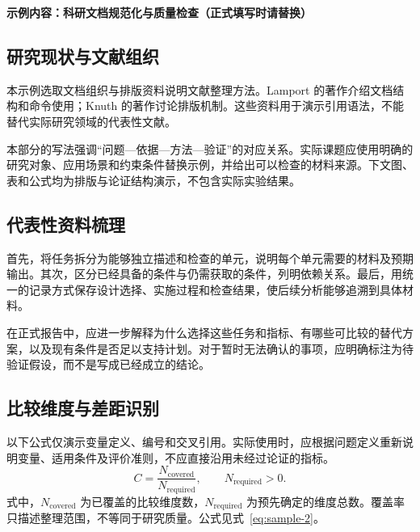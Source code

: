 \noindent\textbf{示例内容：科研文档规范化与质量检查（正式填写时请替换）}\par

\subsection{研究现状与文献组织}
本示例选取文档组织与排版资料说明文献整理方法。Lamport 的著作介绍文档结构和命令使用\cite{lamport1994latex}；Knuth 的著作讨论排版机制\cite{knuth1984texbook}。这些资料用于演示引用语法，不能替代实际研究领域的代表性文献。

本部分的写法强调“问题—依据—方法—验证”的对应关系。实际课题应使用明确的研究对象、应用场景和约束条件替换示例，并给出可以检查的材料来源。下文图、表和公式均为排版与论证结构演示，不包含实际实验结果。

\subsection{代表性资料梳理}
首先，将任务拆分为能够独立描述和检查的单元，说明每个单元需要的材料及预期输出。其次，区分已经具备的条件与仍需获取的条件，列明依赖关系。最后，用统一的记录方式保存设计选择、实施过程和检查结果，使后续分析能够追溯到具体材料。

在正式报告中，应进一步解释为什么选择这些任务和指标、有哪些可比较的替代方案，以及现有条件是否足以支持计划。对于暂时无法确认的事项，应明确标注为待验证假设，而不是写成已经成立的结论。

\subsection{比较维度与差距识别}
以下公式仅演示变量定义、编号和交叉引用。实际使用时，应根据问题定义重新说明变量、适用条件及评价准则，不应直接沿用未经过论证的指标。
\begin{equation}\label{eq:sample-2}
C=\frac{N_{\mathrm{covered}}}{N_{\mathrm{required}}},\qquad N_{\mathrm{required}}>0.
\end{equation}
式中，$N_{\mathrm{covered}}$ 为已覆盖的比较维度数，$N_{\mathrm{required}}$ 为预先确定的维度总数。覆盖率只描述整理范围，不等同于研究质量。公式见式~\eqref{eq:sample-2}。


